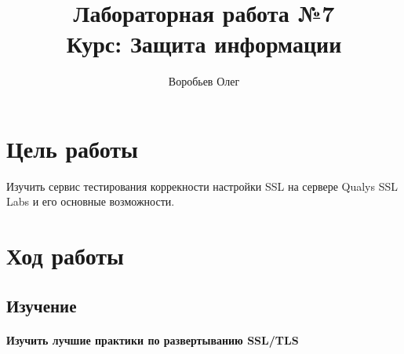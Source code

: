 \documentclass{article}
\title{Лабораторная работа №7 \\ Курс: Защита информации}
\author{Воробьев Олег}
\begin{document}
	\maketitle
	\clearpage
	\tableofcontents
	\clearpage
	
\section{Цель работы}

Изучить сервис тестирования коррекности настройки SSL на сервере Qualys SSL Labs и его основные возможности.

\section{Ход работы}
\subsection{Изучение}
\paragraph{Изучить лучшие практики по развертыванию SSL/TLS}
\end{document}
